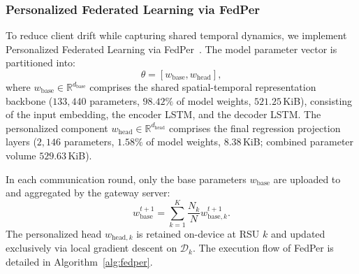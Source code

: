 \documentclass[journal]{IEEEtran}
\begin{document}
\subsubsection{Personalized Federated Learning via FedPer}
To reduce client drift while capturing shared temporal dynamics, we implement Personalized Federated Learning via FedPer~\cite{arivazhagan2019federated}. The model parameter vector is partitioned into:
\begin{equation}
\theta = [w_{\mathrm{base}}, w_{\mathrm{head}}],
\label{eq:param_split}
\end{equation}
where $w_{\mathrm{base}} \in \mathbb{R}^{d_{\mathrm{base}}}$ comprises the shared spatial-temporal representation backbone ($133,440$ parameters, $98.42\%$ of model weights, $521.25$\,KiB), consisting of the input embedding, the encoder LSTM, and the decoder LSTM. The personalized component $w_{\mathrm{head}} \in \mathbb{R}^{d_{\mathrm{head}}}$ comprises the final regression projection layers ($2,146$ parameters, $1.58\%$ of model weights, $8.38$\,KiB; combined parameter volume $529.63$\,KiB).

In each communication round, only the base parameters $w_{\mathrm{base}}$ are uploaded to and aggregated by the gateway server:
\begin{equation}
w_{\mathrm{base}}^{t+1} = \sum_{k=1}^K \frac{N_k}{N} w_{\mathrm{base}, k}^{t+1}.
\label{eq:base_aggregation}
\end{equation}
The personalized head $w_{\mathrm{head}, k}$ is retained on-device at RSU $k$ and updated exclusively via local gradient descent on $\mathcal{D}_k$. The execution flow of FedPer is detailed in Algorithm~\ref{alg:fedper}.
\end{document}
